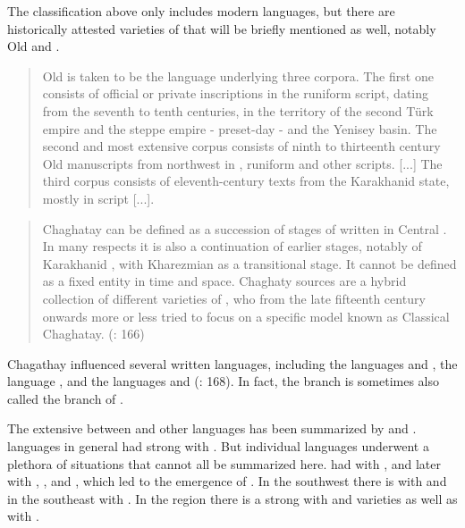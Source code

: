 The classification above only includes modern  languages, but there are historically attested varieties of  that will be briefly mentioned as well, notably Old  and .

\begin{quote}
Old  is taken to be the language underlying three corpora. The first one consists of official or private inscriptions in the runiform script, dating from the seventh to tenth centuries, in the territory of the second Türk empire and the  steppe empire - preset-day  - and the Yenisey basin. The second and most extensive corpus consists of ninth to thirteenth century Old  manuscripts from northwest  in , runiform and other scripts. [...] The third corpus consists of eleventh-century texts from the Karakhanid state, mostly in  script [...]. \citep[138]{Erdal1998}
\end{quote}

\begin{quote}
Chaghatay can be defined as a succession of stages of written  in Central . In many respects it is also a continuation of earlier stages, notably of Karakha\-nid , with Kharezmian  as a transitional stage. It cannot be defined as a fixed entity in time and space. Chaghaty sources are a hybrid collection of different varieties of , who from the late fifteenth century onwards more or less tried to focus on a specific model known as Classical Chaghatay. (\citealt{BoeschotenVandamme1998}: 166)
\end{quote}

\noindent Chagathay influenced several written languages, including the  languages  and , the  language , and the  languages  and  (\citealt{BoeschotenVandamme1998}: 168). In fact, the  branch is sometimes also called the  branch of . 

The extensive  between  and other languages has been summarized by \citet{Schönig2003} and \citet{Johanson2010}.  languages in general had strong  with . But individual languages underwent a plethora of  situations that cannot all be summarized here.  had  with , and later with , , and , which led to the emergence of . In the southwest there is  with  and in the southeast with . In the  region there is a strong  with  and  varieties as well as with .

